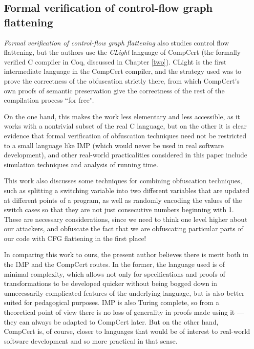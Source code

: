 \documentclass[12pt,notitlepage]{report}
\theoremstyle{plain}
\theoremstyle{definition}
\newcommand{\define}[1]{\emph{#1}\index{#1}}
\numberwithin{equation}{section}
\begin{document}
\subsection*{Formal verification of control-flow graph flattening}
\par \emph{Formal verification of control-flow graph flattening} \cite{Blazy2} also studies control flow flattening, but the authors use the \define{CLight} language of CompCert (the formally verified C compiler in Coq, discussed in Chapter \ref{two}).  CLight is the first intermediate language in the CompCert compiler, and the strategy used was to prove the correctness of the obfuscation strictly there, from which CompCert's own proofs of semantic preservation give the correctness of the rest of the compilation process ``for free".
\par On the one hand, this makes the work less elementary and less accessible, as it works with a nontrivial subset of the real C language, but on the other it is clear evidence that formal verification of obfuscation techniques need not be restricted to a small language like IMP (which would never be used in real software development), and other real-world practicalities considered in this paper include simulation techniques and analysis of running time.  
\par This work also discusses some techniques for combining obfuscation techniques, such as splitting a switching variable into two different variables that are updated at different points of a program, as well as randomly encoding the values of the switch cases so that they are not just consecutive numbers beginning with 1.  These are necessary considerations, since we need to think one level higher about our attackers, and obfuscate the fact that we are obfuscating particular parts of our code with CFG flattening in the first place!
\par In comparing this work to ours, the present author believes there is merit both in the IMP and the CompCert routes.  In the former, the language used is of minimal complexity, which allows not only for specifications and proofs of transformations to be developed quicker without being bogged down in unnecessarily complicated features of the underlying language, but is also better suited for pedagogical purposes.  IMP is also Turing complete, so from a theoretical point of view there is no loss of generality in proofs made using it --- they can always be adapted to CompCert later.  But on the other hand, CompCert is, of course, closer to languages that would be of interest to real-world software development and so more practical in that sense.
\end{document}
